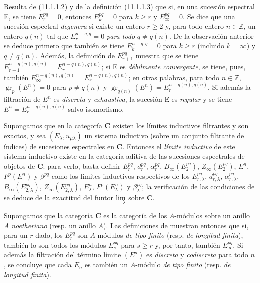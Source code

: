 \begin{env}[11.1.6]
\label{0.11.1.6-fr}
Resulta de (\hyperref[0.11.1.1.2-fr]{11.1.1.2}) y de la definición (\hyperref[0.11.1.1.3-fr]{11.1.1.3}) que si, en una sucesión espectral E, se tiene
$E_r^{pq}=0$, entonces $E_k^{pq}=0$ para $k\geq r$ y $E_\infty^{pq}=0$.
Se dice que una sucesión espectral \emph{degenera} si existe un entero $r\geq2$ y, para todo entero $n\in\mathbb Z$, un entero $q(n)$ tal que $E_r^{n-q,q}=0$ \emph{para todo} $q\ne q(n)$.
De la observación anterior se deduce primero que también se tiene $E_k^{n-q,q}=0$ para $k\geq r$ (incluido $k=\infty$) y $q\ne q(n)$.
Además, la definición de $E_{r+1}^{pq}$ muestra que se tiene $E_{r+1}^{n-q(n),q(n)}=E_r^{n-q(n),q(n)}$; si E es \emph{débilmente convergente}, se tiene, pues, también
$E_\infty^{n-q(n),q(n)}=E_r^{n-q(n),q(n)}$; en otras palabras, para todo $n\in\mathbb Z$, $\operatorname{gr}_p(E^n)=0$ para $p\ne q(n)$ y $\operatorname{gr}_{q(n)}(E^n)=E_r^{n-q(n),q(n)}$.
Si además la filtración de $E^n$ es \emph{discreta} y \emph{exhaustiva}, la sucesión E es \emph{regular} y se tiene
$E^n=E_r^{n-q(n),q(n)}$ salvo isomorfismo.
\end{env}

\begin{env}[11.1.7]
\label{0.11.1.7}
\label{0.11.1.7-fr}
Supongamos que en la categoría $\boldsymbol{C}$ existen los límites inductivos filtrantes y son exactos, y sea $(E_\lambda,u_{\mu\lambda})$ un sistema inductivo (sobre un conjunto filtrante de índices) de sucesiones espectrales en $\boldsymbol{C}$.
Entonces el \emph{límite inductivo} de este sistema inductivo existe en la categoría aditiva de las sucesiones espectrales de objetos de $\boldsymbol{C}$: para verlo, basta definir $E_r^{pq}$, $d_r^{pq}$, $\alpha_r^{pq}$, $B_\infty(E_2^{pq})$, $Z_\infty(E_2^{pq})$, $E^n$, $F^p(E^n)$ y $\beta^{pq}$ como los límites inductivos respectivos de los $E_{r,\lambda}^{pq}$, $d_{r,\lambda}^{pq}$, $\alpha_{r,\lambda}^{pq}$, $B_\infty(E_{2,\lambda}^{pq})$, $Z_\infty(E_{2,\lambda}^{pq})$, $E_\lambda^n$, $F^p(E_\lambda^n)$ y $\beta_\lambda^{pq}$; la verificación de las condiciones de  se deduce de la exactitud del funtor $\varinjlim$ sobre $\boldsymbol{C}$.
\end{env}

\begin{remark}[11.1.8]
\label{0.11.1.8}
\label{0.11.1.8-fr}
Supongamos que la categoría $\boldsymbol{C}$ es la categoría de los $A$-módulos sobre un anillo $A$ \emph{noetheriano} (resp. un anillo $A$).
Las definiciones de  muestran entonces que si, para un $r$ dado, los $E_r^{pq}$ son $A$-módulos \emph{de tipo finito} (resp. \emph{de longitud finita}), también lo son todos los módulos $E_s^{pq}$ para $s\geq r$ y, por tanto, también $E_\infty^{pq}$.
Si además la filtración del término límite $(E^n)$ es \emph{discreta} y \emph{codiscreta} para todo $n$, se concluye que cada $E_n$ es también un $A$-módulo \emph{de tipo finito} (resp. \emph{de longitud finita}).
\end{remark}

